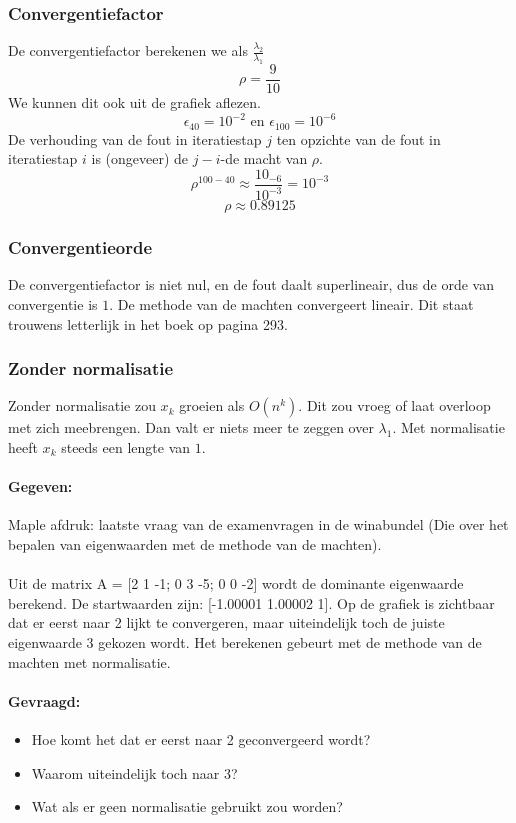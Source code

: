 \documentclass[examenvragen.tex]{subfiles}
\begin{document}
\subsubsection{Convergentiefactor}
De convergentiefactor berekenen we als $\frac{\lambda_{2}}{\lambda_{1}}$
\[
\rho = \frac{9}{10}
\]
We kunnen dit ook uit de grafiek aflezen.
\[
\epsilon_{40} = 10^{-2} \text{ en } \epsilon_{100} = 10^{-6}
\]
De verhouding van de fout in iteratiestap $j$ ten opzichte van de fout in iteratiestap $i$ is (ongeveer) de $j-i$-de macht van $\rho$.
\[
\rho^{100-40} \approx \frac{10_{-6}}{10^{-3}} = 10^{-3}
\]
\[
\rho \approx 0.89125
\]
\subsubsection{Convergentieorde}
De convergentiefactor is niet nul, en de fout daalt superlineair, dus de orde van convergentie is $1$. De methode van de machten convergeert lineair. Dit staat trouwens letterlijk in het boek op pagina 293.

\subsubsection{Zonder normalisatie}
Zonder normalisatie zou $x_{k}$ groeien als $O(n^{k})$. Dit zou vroeg of laat overloop met zich meebrengen. Dan valt er niets meer te zeggen over $\lambda_{1}$. Met normalisatie heeft $x_{k}$ steeds een lengte van $1$.

\iffalse
\paragraph{Gegeven:}
Maple afdruk: laatste vraag van de examenvragen in de winabundel (Die over het bepalen van eigenwaarden met de methode van de machten).\\
\\
Uit de matrix A = [2 1 -1; 0 3 -5; 0 0 -2] wordt de dominante eigenwaarde berekend. De startwaarden zijn: [-1.00001 1.00002 1]. Op de grafiek is zichtbaar dat er eerst naar 2 lijkt te convergeren, maar uiteindelijk toch de juiste eigenwaarde 3 gekozen wordt. Het berekenen gebeurt met de methode van de machten met normalisatie.
\paragraph{Gevraagd:}
\begin{itemize}
	\item Hoe komt het dat er eerst naar 2 geconvergeerd wordt?
	\item Waarom uiteindelijk toch naar 3?
	\item Wat als er geen normalisatie gebruikt zou worden?
\end{itemize}
\end{document}
